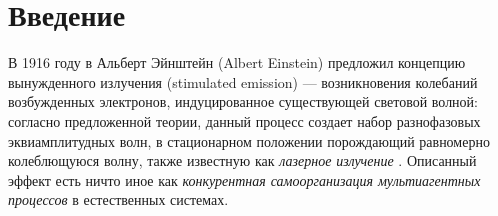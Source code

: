 \chapter{Введение}
\label{chap:Intro}









В 1916 году в \cite{einstein} Альберт Эйнштейн (Albert Einstein) предложил концепцию вынужденного излучения (stimulated emission) --- возникновения колебаний возбужденных электронов, индуцированное существующей световой волной: согласно предложенной теории, данный процесс создает набор разнофазовых эквиамплитудных волн, в стационарном положении порождающий равномерно колеблющуюся волну, также известную как \emph{лазерное излучение} \cite{steen}. Описанный эффект есть ничто иное как \emph{конкурентная самоорганизация мультиагентных процессов} в естественных системах. 

